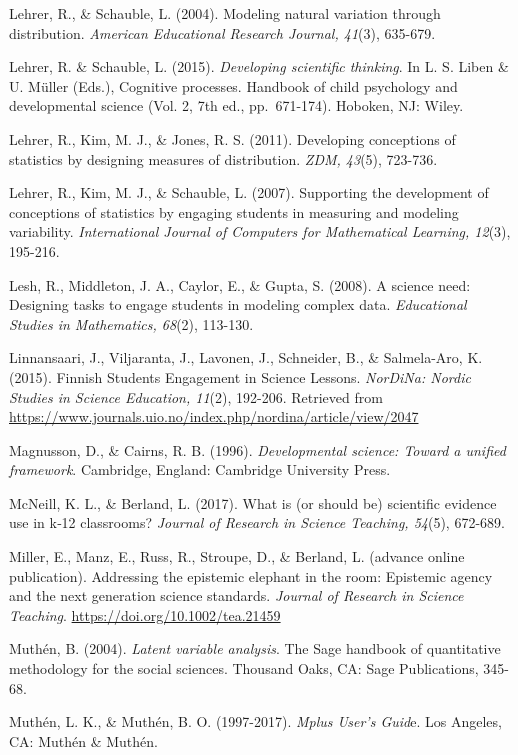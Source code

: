 \documentclass[]{msu-thesis}
\theoremstyle{definition}
\theoremstyle{definition}
\theoremstyle{definition}
\theoremstyle{remark}
\begin{document}
Lehrer, R., \& Schauble, L. (2004). Modeling natural variation through
distribution. \emph{American Educational Research Journal, 41}(3),
635-679.

Lehrer, R. \& Schauble, L. (2015). \emph{Developing scientific
thinking}. In L. S. Liben \& U. Müller (Eds.), Cognitive processes.
Handbook of child psychology and developmental science (Vol. 2, 7th ed.,
pp.~671-174). Hoboken, NJ: Wiley.

Lehrer, R., Kim, M. J., \& Jones, R. S. (2011). Developing conceptions
of statistics by designing measures of distribution. \emph{ZDM, 43}(5),
723-736.

Lehrer, R., Kim, M. J., \& Schauble, L. (2007). Supporting the
development of conceptions of statistics by engaging students in
measuring and modeling variability. \emph{International Journal of
Computers for Mathematical Learning, 12}(3), 195-216.

Lesh, R., Middleton, J. A., Caylor, E., \& Gupta, S. (2008). A science
need: Designing tasks to engage students in modeling complex data.
\emph{Educational Studies in Mathematics, 68}(2), 113-130.

Linnansaari, J., Viljaranta, J., Lavonen, J., Schneider, B., \&
Salmela-Aro, K. (2015). Finnish Students Engagement in Science Lessons.
\emph{NorDiNa: Nordic Studies in Science Education, 11}(2), 192-206.
Retrieved from
\url{https://www.journals.uio.no/index.php/nordina/article/view/2047}

Magnusson, D., \& Cairns, R. B. (1996). \emph{Developmental science:
Toward a unified framework}. Cambridge, England: Cambridge University
Press.

McNeill, K. L., \& Berland, L. (2017). What is (or should be) scientific
evidence use in k‐12 classrooms? \emph{Journal of Research in Science
Teaching, 54}(5), 672-689.

Miller, E., Manz, E., Russ, R., Stroupe, D., \& Berland, L. (advance
online publication). Addressing the epistemic elephant in the room:
Epistemic agency and the next generation science standards.
\emph{Journal of Research in Science Teaching}.
\url{https://doi.org/10.1002/tea.21459}

Muthén, B. (2004). \emph{Latent variable analysis}. The Sage handbook of
quantitative methodology for the social sciences. Thousand Oaks, CA:
Sage Publications, 345-68.

Muthén, L. K., \& Muthén, B. O. (1997-2017). \emph{Mplus User's Guid}e.
Los Angeles, CA: Muthén \& Muthén.
\end{document}
